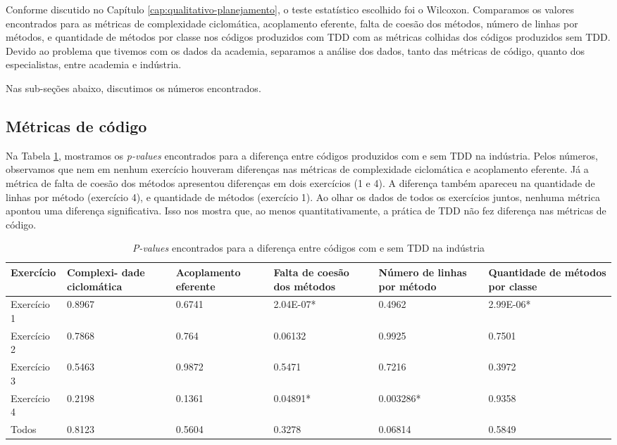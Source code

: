 Conforme discutido no Capítulo \ref{cap:qualitativo-planejamento}, o teste
estatístico escolhido foi o Wilcoxon. Comparamos os valores encontrados
para as métricas de complexidade ciclomática, acoplamento eferente, falta
de coesão dos métodos, número de linhas por métodos, e quantidade de métodos
por classe nos códigos produzidos com TDD com as métricas colhidas dos
códigos produzidos sem TDD.
Devido ao problema que tivemos com os dados da academia, separamos a análise
dos dados, tanto das métricas de código, quanto dos especialistas, entre academia e indústria.

Nas sub-seções abaixo, discutimos os números encontrados.

\subsection{Métricas de código}

Na Tabela \ref{metricas-industria}, mostramos os \textit{p-values} encontrados para
a diferença entre códigos produzidos com e sem TDD na indústria. Pelos números, 
observamos que nem em nenhum exercício houveram diferenças nas métricas
de complexidade ciclomática e acoplamento eferente. Já a métrica de falta
de coesão dos métodos apresentou diferenças em dois exercícios (1 e 4). 
A diferença também apareceu na quantidade de linhas por método (exercício 4),
e quantidade de métodos (exercício 1). Ao olhar os dados de todos os exercícios
juntos, nenhuma métrica apontou uma diferença significativa.
Isso nos mostra que, ao menos quantitativamente, a prática de TDD não fez
diferença nas métricas de código.

\begin{table}
	\begin{tabular}{ | p{3cm} | p{2cm} | p{2cm} | p{2cm} | p{2cm} | p{2cm} |}
		\hline
		Exercício & Complexi- dade ciclomática & Acoplamento eferente & Falta de coesão dos métodos & Número de linhas por método 
		& Quantidade de métodos por classe \\
		\hline
		Exercício 1 &	0.8967	&	0.6741 &	2.04E-07* &	0.4962 &	2.99E-06* \\
		Exercício 2	& 0.7868	&	0.764 &	0.06132 &	0.9925 &	0.7501 \\
		Exercício 3	& 0.5463	&	0.9872 &	0.5471 &	0.7216 &	0.3972\\
		Exercício 4	& 0.2198	&	0.1361 &	0.04891* &	0.003286* &	0.9358\\
		\hline
		Todos &	0.8123	&	0.5604 &	0.3278 &	0.06814 &	0.5849\\
		\hline
	\end{tabular}
	\caption{\textit{P-values} encontrados para a diferença entre códigos com e sem TDD na indústria}
	\label{metricas-industria}
\end{table}


